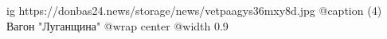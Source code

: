  
 
 
 
 

\ifcmt
  ig https://donbas24.news/storage/news/vetpaagys36mxy8d.jpg
	@caption (4) Вагон "Луганщина"
  @wrap center
  @width 0.9
\fi
